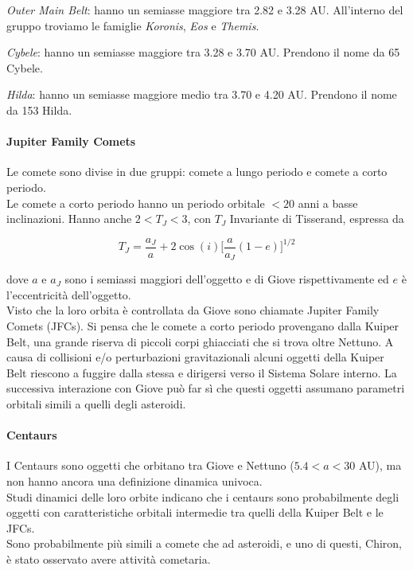 \documentclass[a4paper,11pt,openright]{book}
\begin{document}
\textit{Outer Main Belt}: hanno un semiasse maggiore tra 2.82 e 3.28 AU. All’interno del gruppo troviamo le famiglie \textit{Koronis}, \textit{Eos} e \textit{Themis}.

\textit{Cybele}: hanno un semiasse maggiore tra 3.28 e 3.70 AU. Prendono il nome da 65 Cybele.

\textit{Hilda}: hanno un semiasse maggiore medio tra 3.70 e 4.20 AU. Prendono il nome da 153 Hilda.

\paragraph*{Jupiter Family Comets}
Le comete sono divise in due gruppi: comete a lungo periodo e comete a corto periodo.\\
Le comete a corto periodo hanno un periodo orbitale $< 20$ anni a basse inclinazioni. Hanno anche $2<T_J<3$, con $T_J$ Invariante di Tisserand, espressa da

\begin{equation}
    T_J=\frac{a_J}{a}+2\cos(i)\biggl[\frac{a}{a_J}(1-e)\biggr]^{1/2}
\end{equation}

dove $a$ e $a_J$ sono i semiassi maggiori dell'oggetto e di Giove rispettivamente ed $e$ è l'eccentricità dell'oggetto.\\
Visto che la loro orbita è controllata da Giove sono chiamate Jupiter Family Comets (JFCs). Si pensa che le comete a corto periodo provengano dalla Kuiper Belt, una grande riserva di piccoli corpi ghiacciati che si trova oltre Nettuno. A causa di collisioni e/o perturbazioni gravitazionali alcuni oggetti della Kuiper Belt riescono a fuggire dalla stessa e dirigersi verso il Sistema Solare interno. La successiva interazione con Giove può far sì che questi oggetti assumano parametri orbitali simili a quelli degli asteroidi.

\paragraph*{Centaurs}
I Centaurs sono oggetti che orbitano tra Giove e Nettuno ($5.4<a<30$ AU), ma non hanno ancora una definizione dinamica univoca.\\
Studi dinamici delle loro orbite indicano che i centaurs sono probabilmente degli oggetti con caratteristiche orbitali intermedie tra quelli della Kuiper Belt e le JFCs.\\
Sono probabilmente più simili a comete che ad asteroidi, e uno di questi, Chiron, è stato osservato avere attività cometaria.
\end{document}
